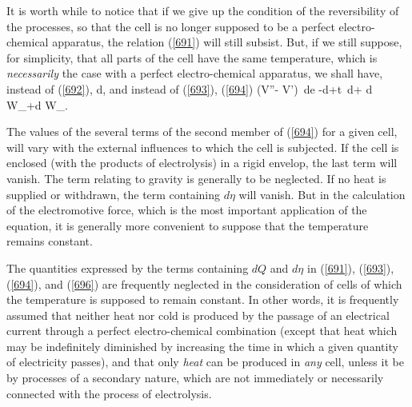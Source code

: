 \documentclass[12pt]{article}
\begin{document}
It is worth while to notice that if we give up the condition of the reversibility of the processes, so that the cell is no longer supposed to be a perfect electro-chemical apparatus, the relation (\ref{691}) will still subsist. But, if we still suppose, for simplicity, that all parts of the cell have the same temperature, which is \textit{necessarily} the case with a perfect electro-chemical apparatus, we shall have, instead of (\ref{692}),
\eqs d\eta \geq {},   \label{695} \eqe
and instead of (\ref{693}), (\ref{694})
\eqs (V''- V')\, de \leq  -d\epsilon+t \,d\eta + d W_+d W_. \label{696} \eqe

The values of the several terms of the second member of (\ref{694}) for a given cell, will vary with the external influences to which the cell is subjected. If the cell is enclosed (with the products of electrolysis) in a rigid envelop, the last term will vanish. The term relating to gravity is generally to be neglected.  If no heat is supplied or withdrawn, the term containing $d\eta$ will vanish. But in the calculation of the electromotive force, which is the most important application of the equation, it is generally more convenient to suppose that the temperature remains constant.

The quantities expressed by the terms containing $dQ$ and $d\eta$ in (\ref{691}), (\ref{693}), (\ref{694}), and (\ref{696}) are frequently neglected in the consideration of cells of which the temperature is supposed to remain constant. In other words, it is frequently assumed that neither heat nor cold is produced by the passage of an electrical current through a perfect electro-chemical combination (except that heat which may be indefinitely diminished by increasing the time in which a given quantity of electricity passes), and that only \textit{heat} can be produced in \textit{any} cell, unless it be by processes of a secondary nature, which are not immediately or necessarily connected with the process of electrolysis.
\end{document}
